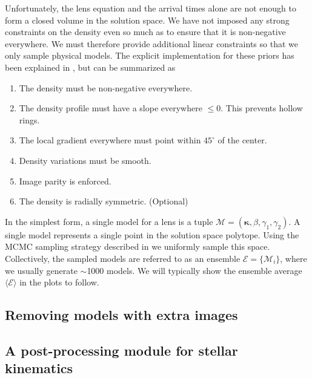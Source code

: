 \documentclass[galley,usenatbib]{mn2e}
\newcommand{\M}{\ensuremath{\mathscr{M}}}
\newcommand{\E}{\ensuremath{\mathscr{E}}}
\newcommand{\Eavg}{\ensuremath{\langle \E \rangle}}
\renewcommand{\vec}[1]{\ensuremath{\boldsymbol{#1}}}
\begin{document}
Unfortunately, the lens equation and the arrival times alone are not enough to form a
closed volume in the solution space. We have not imposed any strong constraints
on the density even so much as to ensure that it is non-negative everywhere. We
must therefore provide additional linear constraints so that we only sample
physical models. The explicit implementation for these priors has been
explained in \cite{}, but can be summarized as
\begin{enumerate}
\item The density must be non-negative everywhere.
\item The density profile must have a slope everywhere $\le 0$. This prevents hollow rings.
\item The local gradient everywhere must point within $45^{\circ}$ of the center.
\item Density variations must be smooth.
\item Image parity is enforced.
\item The density is radially symmetric. (Optional)
\end{enumerate}

In the simplest form, a single model for a lens is a tuple $\M = (\vec\kappa,
\beta, \gamma_1, \gamma_2)$. A single model represents a single point in the
solution space polytope. Using the MCMC sampling strategy described in \cite{}
we uniformly sample this space. Collectively, the sampled models are referred
to as an ensemble $\E = \{\M_i\}$, where we usually generate $\sim$1000 models. We
will typically show the ensemble average $\Eavg$ in the plots to
follow.

\subsection{Removing models with extra images}



\subsection{A post-processing module for stellar kinematics}


\end{document}
